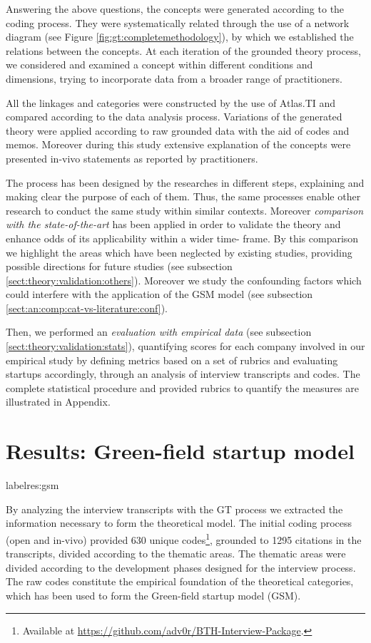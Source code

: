 \documentclass[12pt,journal,compsoc]{../sty/IEEEtran}
\begin{document}
\begin{table}[!t]
Answering the above questions, the concepts were generated according to the
coding process. They were systematically related through the use of a network
diagram (see Figure \ref{fig:gt:completemethodology}), by which we established
the relations between the concepts. At each iteration of the  grounded theory
process, we considered and examined a concept within different  conditions and
dimensions, trying to incorporate data from a broader range of  practitioners.

All the linkages and categories were constructed by the use of Atlas.TI and
compared according to the data analysis process. Variations of the generated
theory were applied according to raw grounded data with the aid of codes and
memos. Moreover during this study extensive explanation of the concepts were
presented in-vivo statements as reported by practitioners.

The process has been designed by the researches in different steps, explaining
and making clear the purpose of each of them. Thus, the same processes enable
other research to conduct the same study within similar contexts. Moreover
\textit{comparison with the state-of-the-art} has been applied in order to
validate the theory and enhance odds of its applicability within a wider  time-
frame. By this comparison we  highlight the areas which have been neglected  by
existing studies, providing possible directions for future studies (see
subsection \ref{sect:theory:validation:others}). Moreover we study the
confounding factors which could interfere with the application of the GSM model
(see subsection \ref{sect:an:comp:cat-vs-literature:conf}).

Then, we performed an \textit{evaluation with empirical data} (see subsection
\ref{sect:theory:validation:stats}), quantifying scores for each company
involved in our empirical study by defining metrics based on a set of rubrics
and evaluating startups accordingly, through an analysis of interview
transcripts and codes. The complete statistical procedure and provided  rubrics
to quantify the measures are illustrated in Appendix.




\section{Results: Green-field startup model} label{res:gsm}

By analyzing the interview transcripts with the GT process we extracted the
information necessary to form the theoretical model. The initial coding process
(open and in-vivo) provided 630 unique codes\footnote{Available at
\url{https://github.com/adv0r/BTH-Interview-Package}.}, grounded to 1295
citations in the transcripts, divided according to the thematic areas. The
thematic areas were divided according to the development phases designed for the
interview process. The raw codes constitute the empirical foundation of the
theoretical categories, which has been used to form the Green-field startup
model (GSM).


\end{table}
\end{document}
